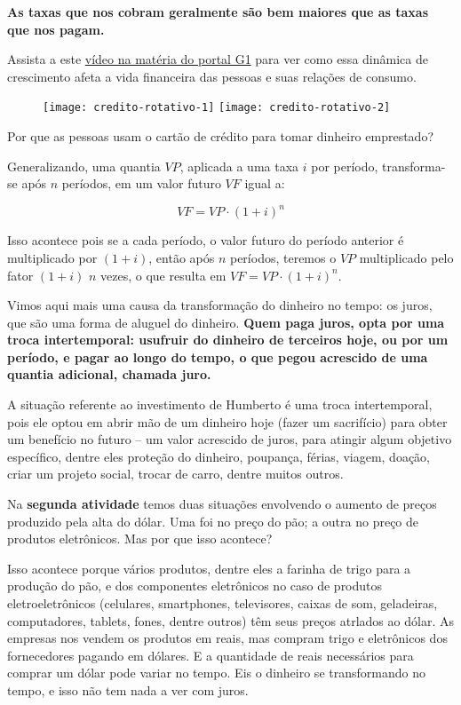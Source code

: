 \textbf{As taxas que nos cobram geralmente são bem maiores que as taxas que nos pagam.}

\begin{reflection}
Assista a este \href{http://g1.globo.com/economia/seu-dinheiro/noticia/divida-do-cartao-de-credito-sera-parcelada.ghtml}{vídeo na matéria do portal G1} para ver como essa dinâmica de crescimento afeta a vida financeira das pessoas e suas relações de consumo.

\begin{figure}[H]
\centering

\texttt{[image: credito-rotativo-1]}
\texttt{[image: credito-rotativo-2]}
\end{figure}


Por que as pessoas usam o cartão de crédito para tomar dinheiro emprestado?
\end{reflection}

Generalizando, uma quantia $VP$, aplicada a uma taxa $i$ por período, transforma-se após $n$ períodos, em um valor futuro $VF$ igual a:

$$VF=VP\cdot(1+i)^n $$ 

Isso acontece pois se a cada período, o valor futuro do período anterior é multiplicado por $(1+i)$, então após $n$ períodos, teremos o $VP$ multiplicado pelo fator $(1+i)$ $n$ vezes, o que resulta em $VF=VP\cdot(1+i)^n$. 

Vimos aqui mais uma causa da transformação do dinheiro no tempo: os juros, que são uma forma de aluguel do dinheiro. \textbf{Quem paga juros, opta por uma troca intertemporal: usufruir do dinheiro de terceiros hoje, ou por um período, e pagar ao longo do tempo, o que pegou acrescido de uma quantia adicional, chamada juro.}

A situação referente ao investimento de Humberto é uma troca intertemporal, pois ele optou em abrir mão de um dinheiro hoje (fazer um sacrifício) para obter um benefício no futuro – um valor acrescido de juros, para atingir algum objetivo específico, dentre eles proteção do dinheiro, poupança, férias, viagem, doação, criar um projeto social, trocar de carro, dentre muitos outros. 

Na \textbf{segunda atividade} temos duas situações envolvendo o aumento de preços produzido pela alta do dólar. Uma foi no preço do pão; a outra no preço de produtos eletrônicos. Mas por que isso acontece?

Isso acontece porque vários produtos, dentre eles a farinha de trigo para a produção do pão, e dos componentes eletrônicos no caso de produtos eletroeletrônicos (celulares, smartphones, televisores, caixas de som, geladeiras, computadores, tablets, fones, dentre outros) têm seus preços atrlados ao dólar. As empresas nos vendem os produtos em reais, mas compram trigo e eletrônicos dos fornecedores pagando em dólares. E a quantidade de reais necessários para comprar um dólar pode variar no tempo. Eis o dinheiro se transformando no tempo, e isso não tem nada a ver com juros.


